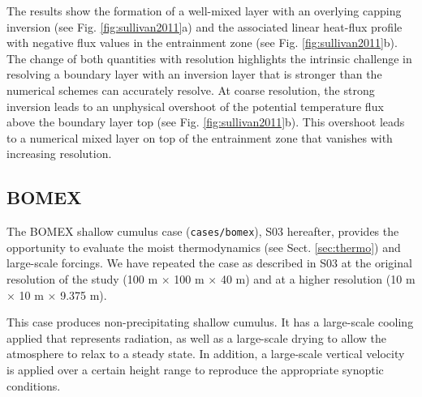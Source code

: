 \documentclass[gmd,manuscript]{copernicus}
\begin{document}
The results show the formation of a well-mixed layer with an overlying capping inversion (see Fig. \ref{fig:sullivan2011}a) and the associated linear heat-flux profile with negative flux values in the entrainment zone (see Fig. \ref{fig:sullivan2011}b). The change of both quantities with resolution highlights the intrinsic challenge in resolving a boundary layer with an inversion layer that is stronger than the numerical schemes can accurately resolve. At coarse resolution, the strong inversion leads to an unphysical overshoot of the potential temperature flux above the boundary layer top (see Fig. \ref{fig:sullivan2011}b). This overshoot leads to a numerical mixed layer on top of the entrainment zone  that vanishes with increasing resolution. %

\subsection{BOMEX}\label{sec:bomex}
The BOMEX shallow cumulus case \citep{Siebesma2003} (\texttt{cases/bomex}), S03 hereafter, provides the opportunity to evaluate the moist thermodynamics (see Sect. \ref{sec:thermo}) and large-scale forcings. We have repeated the case as described in S03 at the original resolution of the study (100 m $\times$ 100 m $\times$ 40 m) and at a higher resolution (10 m $\times$ 10 m $\times$ 9.375 m).

This case produces non-precipitating shallow cumulus. It has a large-scale cooling applied that represents radiation, as well as a large-scale drying to allow the atmosphere to relax to a steady state. In addition, a large-scale vertical velocity is applied over a certain height range to reproduce the appropriate synoptic conditions. 
\end{document}

